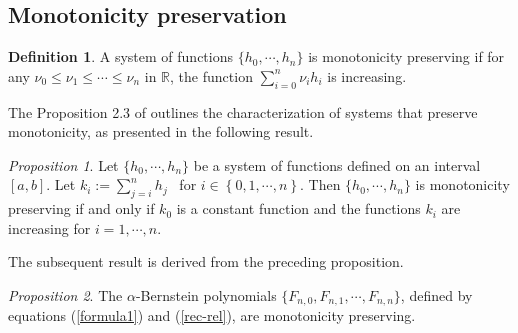 \documentclass[preprint,12pt]{elsarticle}
\theoremstyle{definition}
\newtheorem{definition}{Definition}
\theoremstyle{theorem}
\theoremstyle{lemma}
\theoremstyle{example}
\theoremstyle{remark}
\theoremstyle{prop}
\newtheorem{prop}{Proposition}
\begin{document}
\subsection{Monotonicity preservation}

\begin{definition}
A system of functions $ \{h_{0},\cdots,h_{n}\}$ is monotonicity preserving %
 if for any $\nu _{0}\leq \nu _{1} \leq  \cdots\leq \nu_{n} $ %
in $ \mathbb{R} $, the function $ \sum_{i=0}^{n}\nu  _{i}h_{i} $ is increasing. %
\end{definition}
The Proposition 2.3 of \cite{carnicer1996convexity} outlines the characterization of systems that preserve monotonicity, as presented in the following result. 
\begin{prop}\label{pro1}
Let $\{h_{0},\cdots,h_{n}\}$ be a system of functions defined on an interval $ [a,b]$. Let $ k_{i}:=\sum_{j=i}^{n}h_{j}  $ \ for
$ i \in \left \{  0,1,\cdots,n\right \}$. Then $ \{h_{0},\cdots,h_{n}\}$ is monotonicity preserving if and only if $ k_{0} $ is a constant function and the functions $ k_{i} $ are
increasing for $ i = 1,\cdots,n$. 

\end{prop}
The subsequent result is derived from the preceding proposition.
\begin{prop}\label{pro3.2}
The $\alpha$-Bernstein polynomials $\{F_{n,0}, F_{n,1}, \cdots, F_{n,n}\}$, defined by equations (\ref{formula1}) and (\ref{rec-rel}),  are  monotonicity preserving.
\end{prop}
\end{document}
